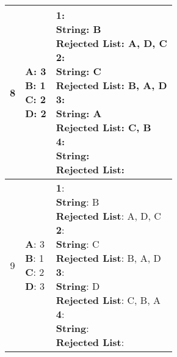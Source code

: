 \documentclass{article}
\begin{document}
\begin{center}
\begin{longtable}{ c|l|l }
        8 & \makecell{\textbf{A}: 3 \\ \textbf{B}: 1 \\ \textbf{C}: 2 \\ \textbf{D}: 2} &  
        \makecell{\textbf{1}:\\ \hspace{10mm} \textbf{String}: B \\ \hspace{10mm} \textbf{Rejected List}: A, D, C \\
                    \textbf{2}:\\ \hspace{10mm} \textbf{String}: C \\ \hspace{10mm} \textbf{Rejected List}: B, A, D \\
                    \textbf{3}:\\ \hspace{10mm} \textbf{String}: A \\ \hspace{10mm} \textbf{Rejected List}: C, B\\
                    \textbf{4}:\\ \hspace{10mm} \textbf{String}:  \\ \hspace{10mm} \textbf{Rejected List}: \\} \\
        \hline 

        9 & \makecell{\textbf{A}: 3 \\ \textbf{B}: 1 \\ \textbf{C}: 2 \\ \textbf{D}: 3} &  
        \makecell{\textbf{1}:\\ \hspace{10mm} \textbf{String}: B \\ \hspace{10mm} \textbf{Rejected List}: A, D, C \\
                    \textbf{2}:\\ \hspace{10mm} \textbf{String}: C \\ \hspace{10mm} \textbf{Rejected List}: B, A, D \\
                    \textbf{3}:\\ \hspace{10mm} \textbf{String}: D \\ \hspace{10mm} \textbf{Rejected List}: C, B, A\\
                    \textbf{4}:\\ \hspace{10mm} \textbf{String}:  \\ \hspace{10mm} \textbf{Rejected List}: \\} \\
        \hline 


\end{longtable}
\end{center}
\end{document}
